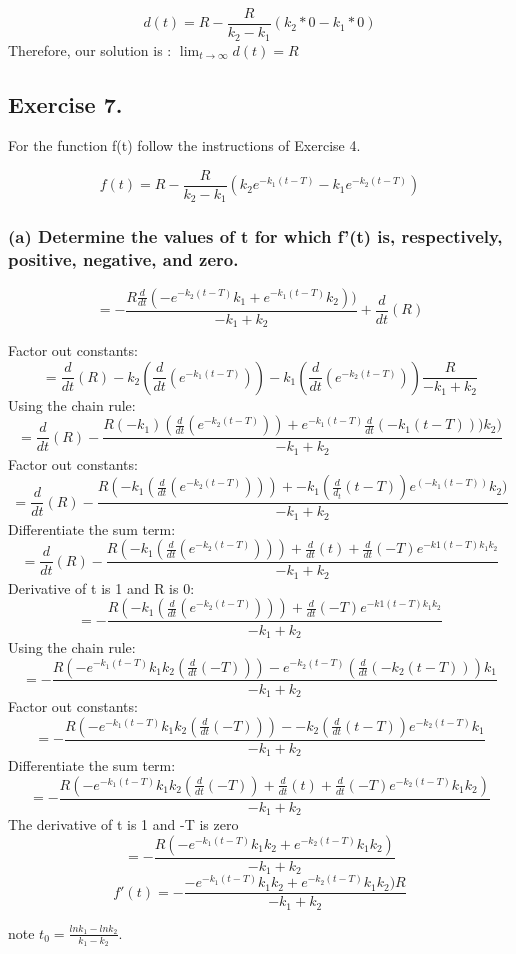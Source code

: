 \documentclass[]{article}
\begin{document}
\[d(t) = R - \frac{R}{k_2 - k_1}(k_2*0 - k_1*0)\] Therefore, our
solution is : \(\lim_{t\to\infty}d(t) =R\)

\subsection{Exercise 7.}\label{exercise-7.}

For the function f(t) follow the instructions of Exercise 4.

\[f(t) = R - \frac{R}{k_2 - k_1}(k_2 e^{-k_1(t-T)}-k_1 e^{-k_2(t-T)})\]

\subsubsection{(a) Determine the values of t for which f'(t) is,
respectively, positive, negative, and
zero.}\label{a-determine-the-values-of-t-for-which-ft-is-respectively-positive-negative-and-zero.}

\[=- \frac{R \frac{d}{dt}(-e^{-k_2 (t-T)}k_1 + e^{-k_1(t - T)}k_2))}{-k_1 + k_2} + \frac{d}{dt}(R)\]

Factor out constants:
\[=\frac{d}{dt}(R) - k_2(\frac{d}{dt}(e^{-k_1(t - T)})) - k_1 (\frac{d}{dt}(e^{-k_2(t-T)})) \frac{R}{-k_1 + k_2}\]
Using the chain rule:
\[=\frac{d}{dt}(R)-\frac{R(-k_1)(\frac{d}{dt}(e^{-k_2(t-T)})) + e^{-k_1(t-T)}\frac{d}{dt}(-k_1(t-T)))k_2)}{-k_1+ k_2}\]
Factor out constants:
\[=\frac{d}{dt}(R) - \frac{R(-k_1(\frac{d}{dt}(e^{-k_2(t-T)})))+-k_1(\frac{d}{d_t}(t-T))e^(-k_1(t-T))k_2)}{-k_1 + k_2}\]
Differentiate the sum term:
\[=\frac{d}{dt}(R) - \frac{R(-k_1(\frac{d}{dt}(e^{-k_2(t-T)})))+ \frac{d}{dt}(t) + \frac{d}{dt}(-T)e^{-k1(t-T)k_1 k_2}}{-k_1 + k_2}\]
Derivative of t is 1 and R is 0:
\[=- \frac{R(-k_1(\frac{d}{dt}(e^{-k_2(t-T)})))+ \frac{d}{dt}(-T)e^{-k1(t-T)k_1 k_2}}{-k_1 + k_2}\]
Using the chain rule:
\[=-\frac{R(-e^{-k_1 (t-T)}k_1 k_2(\frac{d}{dt}(-T)))- e^{-k_2(t-T)}(\frac{d}{dt}(-k_2(t-T)))k_1}{-k_1 + k_2}\]
Factor out constants:
\[=-\frac{R(-e^{-k_1 (t-T)}k_1 k_2(\frac{d}{dt}(-T)))- -k_2(\frac{d}{dt}(t-T))e^{-k_2 (t-T)}k_1}{-k_1 + k_2}\]
Differentiate the sum term:
\[=-\frac{R(-e^{-k_1(t-T)}k_1 k_2(\frac{d}{dt}(-T)) + \frac{d}{dt}(t)+\frac{d}{dt}(-T)e^{-k_2(t-T)}k_1 k_2)}{-k_1 + k_2}\]
The derivative of t is 1 and -T is zero
\[=-\frac{R(-e^{-k_1(t-T)}k_1 k_2 + e^{-k_2(t-T)}k_1 k_2)}{-k_1 + k_2}\]
\[f'(t)=-\frac{-e^{-k_1 (t -T)}k_1 k_2 + e^{-k_2(t-T)}k_1 k_2)R}{-k_1 + k_2}\]

note \(t_0 = \frac{ln k_1 - ln k_2}{k_1 - k_2}\).
\end{document}
